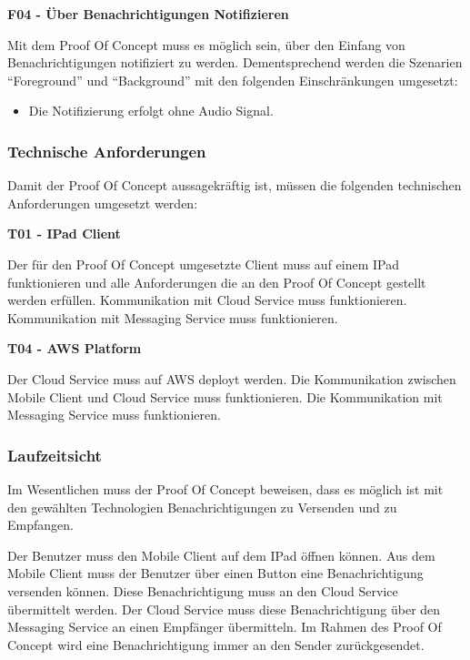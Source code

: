 \textbf{F04 - Über Benachrichtigungen Notifizieren}

Mit dem Proof Of Concept muss es möglich sein, über den Einfang von Benachrichtigungen notifiziert zu werden.
Dementsprechend werden die Szenarien ``Foreground'' und ``Background'' mit den folgenden Einschränkungen umgesetzt:

\begin{itemize}
    \item Die Notifizierung erfolgt ohne Audio Signal.
\end{itemize}

\clearpage
\subsubsection{Technische Anforderungen}

Damit der Proof Of Concept aussagekräftig ist, müssen die folgenden technischen Anforderungen umgesetzt werden:

\textbf{T01 - IPad Client}

Der für den Proof Of Concept umgesetzte Client muss auf einem IPad funktionieren und alle Anforderungen die an den
Proof Of Concept gestellt werden erfüllen. Kommunikation mit Cloud Service muss funktionieren. Kommunikation mit Messaging Service muss funktionieren.


\textbf{T04 - AWS Platform}

Der Cloud Service muss auf AWS deployt werden. Die Kommunikation zwischen Mobile Client und Cloud Service muss funktionieren.
Die Kommunikation mit Messaging Service muss funktionieren.


\subsubsection{Laufzeitsicht}

Im Wesentlichen muss der Proof Of Concept beweisen, dass es möglich ist mit den gewählten Technologien Benachrichtigungen zu Versenden und zu Empfangen.

Der Benutzer muss den Mobile Client auf dem IPad öffnen können.
Aus dem Mobile Client muss der Benutzer über einen Button eine Benachrichtigung versenden können.
Diese Benachrichtigung muss an den Cloud Service übermittelt werden.
Der Cloud Service muss diese Benachrichtigung über den Messaging Service an einen Empfänger übermitteln.
Im Rahmen des Proof Of Concept wird eine Benachrichtigung immer an den Sender zurückgesendet.


